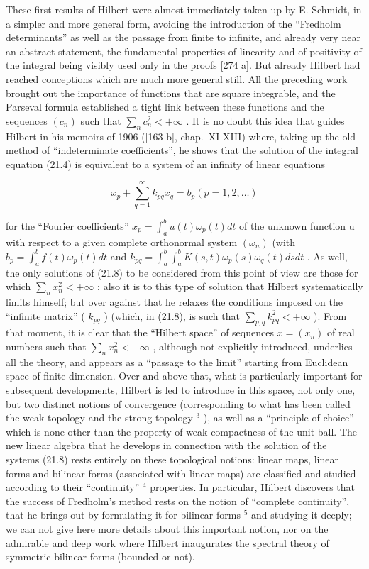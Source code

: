 These first results of Hilbert were almost immediately taken up by E. Schmidt, in a simpler and more general form, avoiding the introduction of the ``Fredholm determinants'' as well as the passage from finite to infinite, and already very near an abstract statement, the fundamental properties of linearity and of positivity of the integral being visibly used only in the proofs {[}274 a{]}. But already Hilbert had reached conceptions which are much more general still. All the preceding work brought out the importance of functions that are square integrable, and the Parseval formula established a tight link between these functions and the sequences \((c_{n})\) such that \(\sum_{n} c_{n}^{2} < +\infty\) . It is no doubt this idea that guides Hilbert in his memoirs of 1906 ({[}163 b{]}, chap.~XI-XIII) where, taking up the old method of ``indeterminate coefficients'', he shows that the solution of the integral equation (21.4) is equivalent to a system of an infinity of linear equations

\[
x _ {p} + \sum_ {q = 1} ^ {\infty} k _ {p q} x _ {q} = b _ {p} (p = 1, 2, \dots)\tag{21.8}
\]

for the ``Fourier coefficients'' \(x_{p} = \int_{a}^{b} u(t) \omega_{p}(t) dt\) of the unknown function u with respect to a given complete orthonormal system \((\omega_{n})\) (with \(b_{p} = \int_{a}^{b} f(t) \omega_{p}(t) dt\) and \(k_{pq} = \int_{a}^{b} \int_{a}^{b} K(s, t) \omega_{p}(s) \omega_{q}(t) ds dt\) . As well, the only solutions of (21.8) to be considered from this point of view are those for which \(\sum_{n} x_{n}^{2} < +\infty\) ; also it is to this type of solution that Hilbert systematically limits himself; but over against that he relaxes the conditions imposed on the ``infinite matrix'' ( \(k_{pq}\) ) (which, in (21.8), is such that \(\sum_{p,q} k_{pq}^{2} < +\infty\) ). From that moment, it is clear that the ``Hilbert space'' of sequences \(x = (x_{n})\) of real numbers such that \(\sum_{n} x_{n}^{2} < +\infty\) , although not explicitly introduced, underlies all the theory, and appears as a ``passage to the limit'' starting from Euclidean space of finite dimension. Over and above that, what is particularly important for subsequent developments, Hilbert is led to introduce in this space, not only one, but two distinct notions of convergence (corresponding to what has been called the weak topology and the strong topology \(^{3}\) ), as well as a ``principle of choice'' which is none other than the property of weak compactness of the unit ball. The new linear algebra that he develops in connection with the solution of the systems (21.8) rests entirely on these topological notions: linear maps, linear forms and bilinear forms (associated with linear maps) are classified and studied according to their ``continuity'' \(^{4}\) properties. In particular, Hilbert discovers that the success of Fredholm's method rests on the notion of ``complete continuity'', that he brings out by formulating it for bilinear forms \(^{5}\) and studying it deeply; we can not give here more details about this important notion, nor on the admirable and deep work where Hilbert inaugurates the spectral theory of symmetric bilinear forms (bounded or not).

